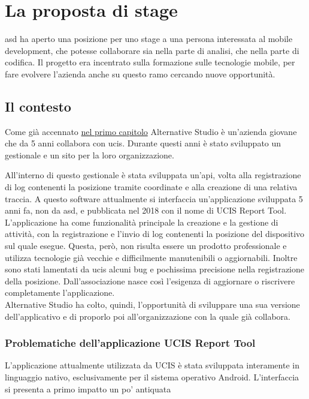 
\section{La proposta di stage}

\acrlong{asd} ha aperto una posizione per uno stage a una persona interessata al mobile development, che potesse collaborare sia nella parte di analisi, che nella parte di codifica. Il progetto era incentrato sulla formazione sulle tecnologie mobile, per fare evolvere l'azienda anche su questo ramo cercando nuove opportunità.

\subsection{Il contesto}

Come già accennato {\hyperref[cap:introduzione]{nel primo capitolo}} Alternative Studio è un'azienda giovane che da 5 anni collabora con
\gls{ucis}. Durante questi anni è stato sviluppato un gestionale e un sito per la loro organizzazione.


All'interno di questo gestionale è stata sviluppata un'\acrshort{api}, volta alla registrazione di log contenenti la posizione tramite
coordinate e alla creazione di una relativa traccia. A questo software attualmente si interfaccia un'applicazione sviluppata 5 anni fa, non
da \acrlong{asd}, e pubblicata nel 2018 con il nome di UCIS Report Tool. L'applicazione ha come funzionalità principale la creazione e la
gestione di attività, con la registrazione e l'invio di log contenenti la posizione del dispositivo sul quale esegue. Questa, però, non
risulta essere un prodotto professionale e utilizza tecnologie già vecchie e difficilmente manutenibili o aggiornabili. Inoltre sono stati
lamentati da \gls{ucis} alcuni bug e pochissima precisione nella registrazione della posizione. Dall'associazione nasce così l'esigenza di aggiornare
o riscrivere completamente l'applicazione. \\
\noindent Alternative Studio ha colto, quindi, l'opportunità di sviluppare una sua versione dell'applicativo e di proporlo poi all'organizzazione con la quale già collabora.

\subsubsection{Problematiche dell'applicazione UCIS Report Tool}
L'applicazione attualmente utilizzata da UCIS è stata sviluppata interamente in linguaggio nativo, esclusivamente per il
sistema operativo \gls{Android}. L'interfaccia si presenta a primo impatto un po' antiquata 

